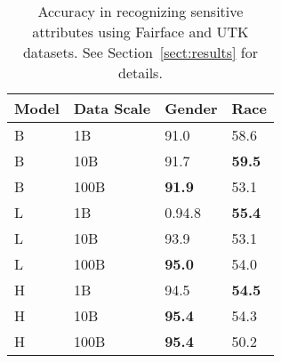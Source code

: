 \begin{table}[t]
    \centering\scriptsize
    \begin{tabularx}{\columnwidth}{@{}ll|YY@{}}
    \toprule
    \bf Model & \bf Data Scale & \bf Gender & \bf Race\\ \midrule
B	&	1B	& 91.0	& 58.6\\
B	&	10B	& 91.7 &	\bf59.5\\
B	&	100B &	\bf91.9	& 53.1\\[3pt]
L	&	1B	& 0.94.8	& \bf55.4\\
L	&	10B	& 93.9	& 53.1\\
L	&	100B &	\bf95.0	& 54.0\\[3pt]
H	&	1B	& 94.5	& \bf54.5\\
H	&	10B	& \bf95.4	& 54.3\\
H	&	100B	& \bf95.4	& 50.2 \\
 \bottomrule
    \end{tabularx}
    \caption{Accuracy in recognizing sensitive attributes using Fairface and UTK datasets. See Section~\ref{sect:results} for details.}
    \label{tab:fairness_pred}
\end{table}